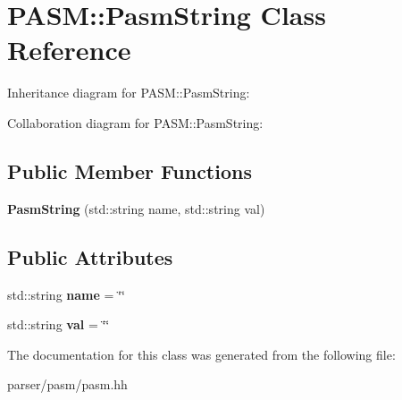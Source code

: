 \hypertarget{classPASM_1_1PasmString}{}\section{P\+A\+SM\+:\+:Pasm\+String Class Reference}
\label{classPASM_1_1PasmString}


Inheritance diagram for P\+A\+SM\+:\+:Pasm\+String\+:


Collaboration diagram for P\+A\+SM\+:\+:Pasm\+String\+:
\subsection*{Public Member Functions}
\begin{DoxyCompactItemize}
\item 
\mbox{\label{classPASM_1_1PasmString_a16e4558d958828eb08c7985c5e7edf06}} 
{\bfseries Pasm\+String} (std\+::string name, std\+::string val)
\end{DoxyCompactItemize}
\subsection*{Public Attributes}
\begin{DoxyCompactItemize}
\item 
\mbox{\label{classPASM_1_1PasmString_aa20970f8371db21415cfda6c03034013}} 
std\+::string {\bfseries name} = \char`\"{}\char`\"{}
\item 
\mbox{\label{classPASM_1_1PasmString_a70443a0acc0c6d3afa8db0f306c7646c}} 
std\+::string {\bfseries val} = \char`\"{}\char`\"{}
\end{DoxyCompactItemize}


The documentation for this class was generated from the following file\+:\begin{DoxyCompactItemize}
\item 
parser/pasm/pasm.\+hh\end{DoxyCompactItemize}
